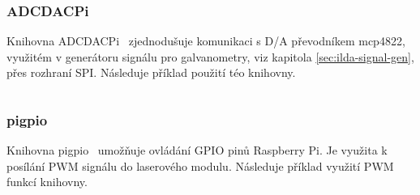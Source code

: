 \subsubsection{ADCDACPi}
Knihovna ADCDACPi~\cite{ADCDACPi} zjednodušuje komunikaci s D/A převodníkem mcp4822, využitém v generátoru signálu pro galvanometry, viz kapitola \ref{sec:ilda-signal-gen}, přes rozhraní SPI. Následuje příklad použití téo knihovny.

\inputminted[frame=lines,fontsize=\footnotesize{}, linenos, breaklines]{cpp}{code_examples/adcdac.cpp}

\subsubsection{pigpio}\label{sec:ls_pigpio}
Knihovna pigpio~\cite{pigpio} umožňuje ovládání GPIO pinů Raspberry Pi. Je využita k posílání PWM signálu do laserového modulu. Následuje příklad využití PWM funkcí knihovny.

\inputminted[frame=lines,fontsize=\footnotesize{}, linenos, breaklines]{cpp}{code_examples/pigpio_pwm.cpp}

